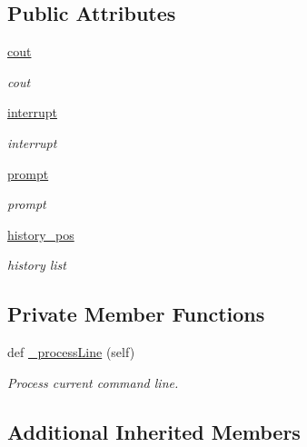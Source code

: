 \subsection*{Public Attributes}
\begin{DoxyCompactItemize}
\item 
\hyperlink{classvisualizer_1_1ipython__view_1_1IPythonView_a40ca2f04484b822de44a2d95816d189e}{cout}
\begin{DoxyCompactList}\small\item\em cout \end{DoxyCompactList}\item 
\hyperlink{classvisualizer_1_1ipython__view_1_1IPythonView_ad3937b08cb14ec5390c2e0101952765e}{interrupt}
\begin{DoxyCompactList}\small\item\em interrupt \end{DoxyCompactList}\item 
\hyperlink{classvisualizer_1_1ipython__view_1_1IPythonView_ac70be49befad3abf7fbb1fa8d460e439}{prompt}
\begin{DoxyCompactList}\small\item\em prompt \end{DoxyCompactList}\item 
\hyperlink{classvisualizer_1_1ipython__view_1_1IPythonView_a7862c74bd0d2e5f58ade1f6410ddca1d}{history\+\_\+pos}
\begin{DoxyCompactList}\small\item\em history list \end{DoxyCompactList}\end{DoxyCompactItemize}
\subsection*{Private Member Functions}
\begin{DoxyCompactItemize}
\item 
def \hyperlink{classvisualizer_1_1ipython__view_1_1IPythonView_aaddffde5e573aaec140612a32208a206}{\+\_\+process\+Line} (self)
\begin{DoxyCompactList}\small\item\em Process current command line. \end{DoxyCompactList}\end{DoxyCompactItemize}
\subsection*{Additional Inherited Members}


